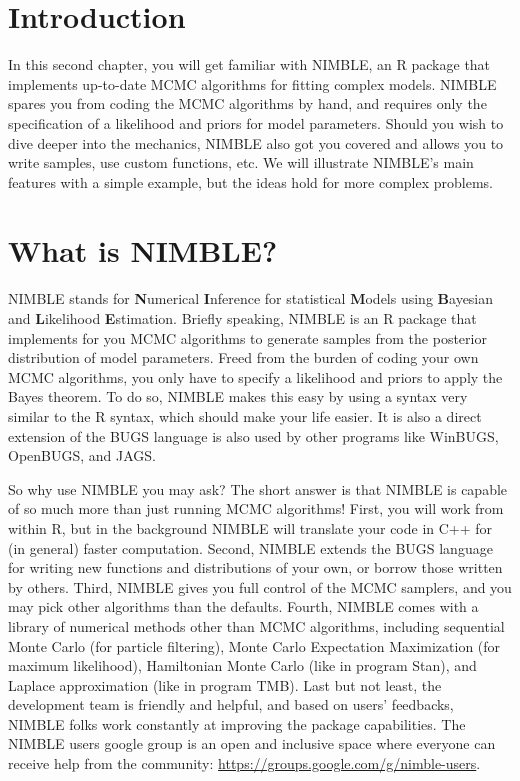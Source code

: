 \documentclass[
  12pt,
]{krantz}
\begin{document}
\section{Introduction}\label{introduction-2}

In this second chapter, you will get familiar with NIMBLE, an R package that implements up-to-date MCMC algorithms for fitting complex models. NIMBLE spares you from coding the MCMC algorithms by hand, and requires only the specification of a likelihood and priors for model parameters. Should you wish to dive deeper into the mechanics, NIMBLE also got you covered and allows you to write samples, use custom functions, etc. We will illustrate NIMBLE's main features with a simple example, but the ideas hold for more complex problems.

\section{What is NIMBLE?}\label{what-is-nimble}

NIMBLE stands for \textbf{N}umerical \textbf{I}nference for statistical \textbf{M}odels using \textbf{B}ayesian and \textbf{L}ikelihood \textbf{E}stimation. Briefly speaking, NIMBLE is an R package that implements for you MCMC algorithms to generate samples from the posterior distribution of model parameters. Freed from the burden of coding your own MCMC algorithms, you only have to specify a likelihood and priors to apply the Bayes theorem. To do so, NIMBLE makes this easy by using a syntax very similar to the R syntax, which should make your life easier. It is also a direct extension of the BUGS language is also used by other programs like WinBUGS, OpenBUGS, and JAGS.

So why use NIMBLE you may ask? The short answer is that NIMBLE is capable of so much more than just running MCMC algorithms! First, you will work from within R, but in the background NIMBLE will translate your code in C++ for (in general) faster computation. Second, NIMBLE extends the BUGS language for writing new functions and distributions of your own, or borrow those written by others. Third, NIMBLE gives you full control of the MCMC samplers, and you may pick other algorithms than the defaults. Fourth, NIMBLE comes with a library of numerical methods other than MCMC algorithms, including sequential Monte Carlo (for particle filtering), Monte Carlo Expectation Maximization (for maximum likelihood), Hamiltonian Monte Carlo (like in program Stan), and Laplace approximation (like in program TMB). Last but not least, the development team is friendly and helpful, and based on users' feedbacks, NIMBLE folks work constantly at improving the package capabilities. The NIMBLE users google group is an open and inclusive space where everyone can receive help from the community: \url{https://groups.google.com/g/nimble-users}.
\end{document}
